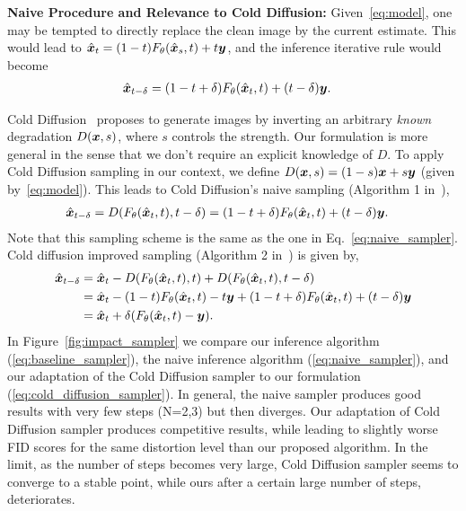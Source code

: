 \documentclass[10pt]{article} %
\begin{document}
\noindent \textbf{Naive Procedure and Relevance to Cold Diffusion:} Given~\eqref{eq:model}, one may be tempted to directly replace the clean image by the current estimate. This would lead to $\hat{{\bm{x}}}_{t} = (1-t) F_\theta(\hat {{\bm{x}}}_s, t) + t {\bm{y}}$, and the inference iterative rule would become
\begin{align}
\hat{{\bm{x}}}_{t-\delta} &= (1-t+\delta) F_\theta(\hat{{\bm{x}}}_t, t) + (t-\delta) {\bm{y}}.
\label{eq:naive_sampler}
\end{align}

Cold Diffusion~\citep{bansal2022cold} proposes to generate images by inverting an arbitrary \emph{known} degradation $D({\bm{x}}, s)$, where $s$ controls the strength. Our formulation is more general in the sense that we don't require an explicit knowledge of $D$. To apply Cold Diffusion sampling in our context, we define $D({\bm{x}}, s) = (1-s){\bm{x}} + s {\bm{y}}$ (given by~\eqref{eq:model}). This leads to Cold Diffusion's naive sampling (Algorithm 1 in~\citet{bansal2022cold}),
\begin{align}
\hat{{\bm{x}}}_{t-\delta} &= D(F_\theta(\hat{{\bm{x}}}_t,t),t-\delta)  = (1-t+\delta)F_\theta(\hat{{\bm{x}}}_t,t) + (t - \delta){\bm{y}}.
\end{align}
Note that this sampling scheme is the same as the one in Eq.~\ref{eq:naive_sampler}. Cold diffusion improved sampling (Algorithm 2 in~\citet{bansal2022cold}) is given by,
\begin{align}
\hat{{\bm{x}}}_{t-\delta} &= \hat{{\bm{x}}}_t - D(F_\theta(\hat{{\bm{x}}}_t, t),t) + D(F_\theta(\hat{{\bm{x}}}_t, t),t-\delta) \\
&= \hat{{\bm{x}}}_t - (1-t)F_\theta(\hat{{\bm{x}}}_t, t) - t{\bm{y}} + (1-t + \delta)F_\theta(\hat{{\bm{x}}}_t, t) + (t - \delta ){\bm{y}} \\
&= \hat{{\bm{x}}}_t + \delta (F_\theta(\hat{{\bm{x}}}_t, t)-{\bm{y}}).
\label{eq:cold_diffusion_sampler}
\end{align}
In Figure~\ref{fig:impact_sampler} we compare our inference algorithm (\eqref{eq:baseline_sampler}), the naive inference algorithm (\eqref{eq:naive_sampler}), and our adaptation of the Cold Diffusion sampler to our formulation (\eqref{eq:cold_diffusion_sampler}). In general, the naive sampler produces good results with very few steps (N=2,3) but then diverges. Our adaptation of Cold Diffusion sampler produces competitive results, while leading to slightly worse FID scores for the same distortion level than our proposed algorithm. In the limit, as the number of steps becomes very large, Cold Diffusion sampler seems to converge to a stable point, while ours after a certain large number of steps, deteriorates.
\end{document}
